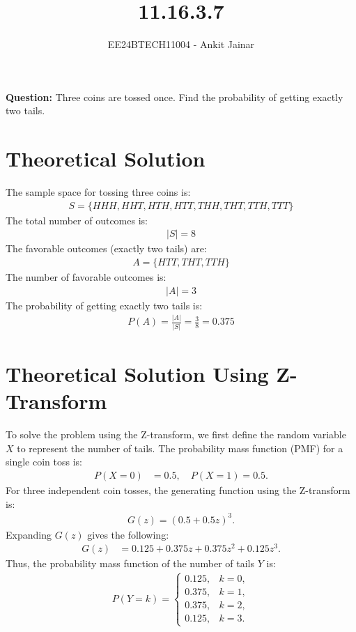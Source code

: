 \documentclass[journal]{IEEEtran}
\begin{document}
\title{11.16.3.7}
\author{EE24BTECH11004 - Ankit Jainar}
\maketitle

\textbf{Question:}
Three coins are tossed once. Find the probability of getting exactly two tails.

\section*{Theoretical Solution}
The sample space for tossing three coins is:
\begin{align}
    S = \{HHH, HHT, HTH, HTT, THH, THT, TTH, TTT\}
\end{align}
The total number of outcomes is:
\begin{align}
    |S| = 8
\end{align}
The favorable outcomes (exactly two tails) are:
\begin{align}
    A = \{HTT, THT, TTH\}
\end{align}
The number of favorable outcomes is:
\begin{align}
    |A| = 3
\end{align}
The probability of getting exactly two tails is:
\begin{align}
    P(A) = \frac{|A|}{|S|} = \frac{3}{8} = 0.375
\end{align}
\section*{Theoretical Solution Using Z-Transform}
To solve the problem using the Z-transform, we first define the random variable \( X \) to represent the number of tails. The probability mass function (PMF) for a single coin toss is:
\begin{align}
    P(X = 0) &= 0.5, \quad P(X = 1) = 0.5.
\end{align}
For three independent coin tosses, the generating function using the Z-transform is:
\begin{align}
    G(z) = (0.5 + 0.5z)^3.
\end{align}
Expanding \( G(z) \) gives the following:
\begin{align}
    G(z) &= 0.125 + 0.375z + 0.375z^2 + 0.125z^3.
\end{align}
Thus, the probability mass function of the number of tails \( Y \) is:
\begin{align}
    P(Y = k) = \begin{cases} 
    0.125, & k = 0, \\
    0.375, & k = 1, \\
    0.375, & k = 2, \\
    0.125, & k = 3.
    \end{cases}
\end{align}
\end{document}
